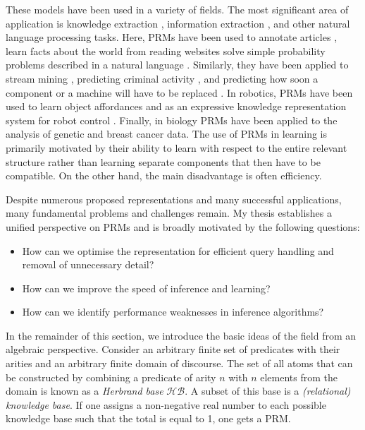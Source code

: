 \documentclass{article}
\begin{document}
These models have been used in a variety of fields. The most significant area of
application is knowledge extraction \cite{DBLP:conf/naacl/PoonV10}, information
extraction \cite{bunescu2007statistical}, and other natural language processing
tasks. Here, PRMs have been used to annotate articles
\cite{DBLP:conf/emnlp/VerbekeAMFDR12}, learn facts about the world from reading
websites \cite{DBLP:conf/aaai/CarlsonBKSHM10} solve simple probability problems
described in a natural language \cite{DBLP:conf/ijcai/DriesKDBR17}. Similarly,
they have been applied to stream mining \cite{DBLP:conf/icdm/ChandraSKTA14},
predicting criminal activity \cite{DBLP:conf/sdm/DelaneyFCWJ10}, and predicting
how soon a component or a machine will have to be replaced
\cite{vlasselaer2012statistical}.
In robotics, PRMs have been used to learn object affordances
\cite{DBLP:conf/iros/MoldovanR14,DBLP:conf/icra/MoldovanMOSR12,DBLP:conf/ilp/MoldovanORMS11}
and as an expressive knowledge representation system for robot control
\cite{DBLP:conf/icra/JainMB09}. Finally, in biology PRMs have been applied to
the analysis of genetic \cite{DBLP:journals/jcb/SakhanenkoG12} and breast cancer
\cite{DBLP:conf/ilp/Corte-RealD017,DBLP:conf/pkdd/NassifKBPSC13} data. The use
of PRMs in learning is primarily motivated by their ability to learn with
respect to the entire relevant structure rather than learning separate
components that then have to be compatible. On the other hand, the main
disadvantage is often efficiency.

Despite numerous proposed representations and many successful applications,
many fundamental problems and challenges remain. My thesis establishes a
unified perspective on PRMs and is broadly motivated by the following questions:
\begin{itemize}
\item How can we optimise the representation for efficient query handling and
  removal of unnecessary detail?
\item How can we improve the speed of inference and learning?
\item How can we identify performance weaknesses in inference algorithms?
\end{itemize}

In the remainder of this section, we introduce the basic ideas of the field from
an algebraic perspective. Consider an arbitrary finite set of predicates with
their arities and an arbitrary finite domain of discourse. The set of all atoms
that can be constructed by combining a predicate of arity $n$ with $n$ elements
from the domain is known as a \emph{Herbrand base} $\mathcal{HB}$. A subset of
this base is a \emph{(relational) knowledge base}. If one assigns a non-negative
real number to each possible knowledge base such that the total is equal to 1,
one gets a PRM.
\end{document}
